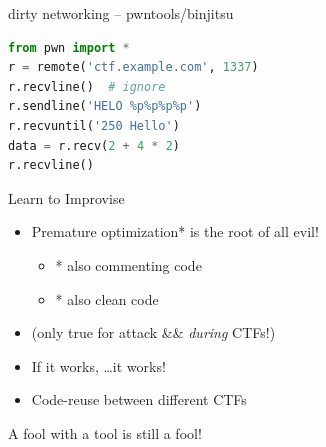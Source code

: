 
\begin{frame}[fragile]
  {dirty networking -- pwntools/binjitsu}

  \begin{lstlisting}[language=python]
from pwn import *
r = remote('ctf.example.com', 1337)
r.recvline()  # ignore
r.sendline('HELO %p%p%p%p')
r.recvuntil('250 Hello')
data = r.recv(2 + 4 * 2)
r.recvline()
  \end{lstlisting}
\end{frame}










\begin{frame}
  {Learn to Improvise}

  \begin{itemize}
    \item Premature optimization* is the root of all evil!
      \begin{itemize}
        \item * also commenting code
        \item * also clean code
      \end{itemize}
    \item (only true for attack \&\&  \emph{during} CTFs!)
    \item If it works, \ldots it works!
    \item Code-reuse between different CTFs
  \end{itemize}

\end{frame}

\begin{frame}
	\begin{center}
		\huge A fool with a tool is still a fool!
	\end{center}
\end{frame}

\begin{frame}
  {}
\end{frame}
